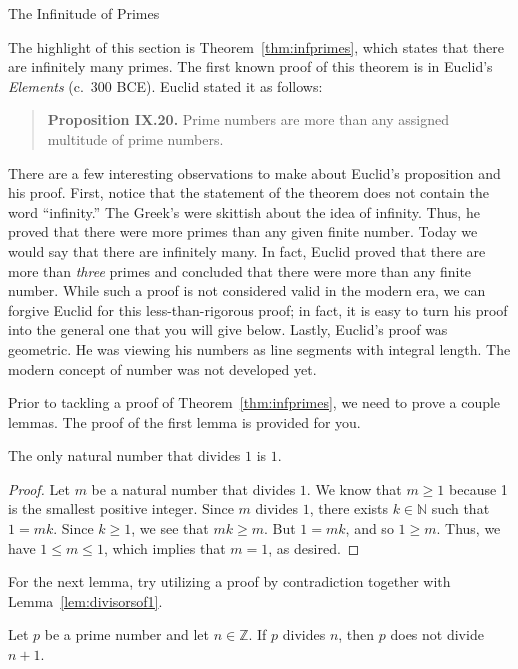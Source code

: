 \begin{section}{The Infinitude of Primes}\label{sec:infinitude of primes}

The highlight of this section is Theorem~\ref{thm:infprimes}, which states that there are infinitely many primes. The first known proof of this theorem is in Euclid's \emph{Elements} (c.\ 300 BCE). Euclid stated it as follows: 
\begin{quote}
\textbf{Proposition IX.20.} Prime numbers are more than any assigned multitude of prime numbers.
\end{quote}
There are a few interesting observations to make about Euclid's proposition and his proof. First, notice that the statement of the theorem does not contain the word ``infinity.'' The Greek's were skittish about the idea of infinity. Thus, he proved that there were more primes than any given finite number. Today we would say that there are infinitely many. In fact, Euclid proved that there are more than \emph{three} primes and concluded that there were more than any finite number. While such a proof is not considered valid in the modern era, we can forgive Euclid for this less-than-rigorous proof;  in fact, it is easy to turn his proof into the general one that you will give below. Lastly, Euclid's proof was geometric. He was viewing his numbers as line segments with integral length. The modern concept of number was not developed yet.

Prior to tackling a proof of Theorem~\ref{thm:infprimes}, we need to prove a couple lemmas.  The proof of the first lemma is provided for you. 

\begin{lemma}\label{lem:divisorsof1}
The only natural number that divides $1$ is $1$.  
\end{lemma}

\begin{proof}
Let $m$ be a natural number that divides $1$. We know that $m\geq 1$ because 1 is the smallest positive integer. Since $m$ divides $1$, there exists $k\in \mathbb{N}$ such that $1=mk$. Since $k\geq 1$, we see that $mk\geq m$.  But $1=mk$, and so $1\geq m$.  Thus, we have $1\leq m \leq 1$, which implies that $m=1$, as desired.
\end{proof}

For the next lemma, try utilizing a proof by contradiction together with Lemma~\ref{lem:divisorsof1}.

\begin{lemma}\label{lem:plus1}
Let $p$ be a prime number and let $n\in \mathbb{Z}$. If $p$ divides $n$, then $p$ does not divide $n+1$.
\end{lemma}


\end{section}
